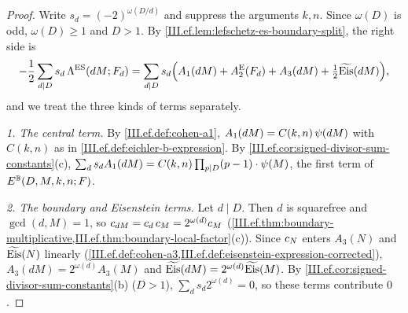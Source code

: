 \begin{theorem}
\end{theorem}
\begin{proof}
Write $s_d=(-2)^{\omega(D/d)}$ and suppress the arguments $k,n$. Since $\omega(D)$ is odd, $\omega(D)\ge1$ and $D>1$. By
\cref{III.ef.lem:lefschetz-es-boundary-split}, the right side is
\[
  -\frac12\sum_{d\mid D}s_d\,\Lambda^{\mathrm{ES}}(dM;F_d)=\sum_{d\mid D}s_d\Bigl(A_1(dM)+A_2^{\mathrm E}(F_d)+A_3(dM)+\tfrac12\widetilde{\mathrm{Eis}}(dM)\Bigr),
\]
and we treat the three kinds of terms separately.

\emph{1. The central term.} By \cref{III.ef.def:cohen-a1}, $A_1(dM)=C(k,n)\,\psi(dM)$ with $C(k,n)$ as in \cref{III.ef.def:eichler-b-expression}. By
\cref{III.ef.cor:signed-divisor-sum-constants}(c), $\sum_ds_dA_1(dM)=C(k,n)\prod_{p\mid D}(p-1)\cdot\psi(M)$, the first term of $E^{\mathbb{B}}(D,M,k,n;F)$.

\emph{2. The boundary and Eisenstein terms.} Let $d\mid D$. Then $d$ is squarefree and $\gcd(d,M)=1$, so
$c_{dM}=c_d\,c_M=2^{\omega(d)}c_M$ (\cref{III.ef.thm:boundary-multiplicative,III.ef.thm:boundary-local-factor}(c)). Since $c_N$ enters
$A_3(N)$ and $\widetilde{\mathrm{Eis}}(N)$ linearly (\cref{III.ef.def:cohen-a3,III.ef.def:eisenstein-expression-corrected}), $A_3(dM)=2^{\omega(d)}A_3(M)$ and
$\widetilde{\mathrm{Eis}}(dM)=2^{\omega(d)}\widetilde{\mathrm{Eis}}(M)$. By \cref{III.ef.cor:signed-divisor-sum-constants}(b) ($D>1$), $\sum_ds_d2^{\omega(d)}=0$, so these terms contribute $0$.


\end{proof}
